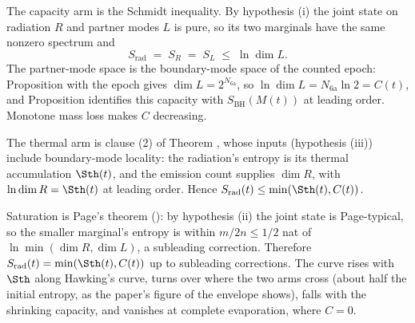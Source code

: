 The capacity arm is the Schmidt inequality. By hypothesis (i) the joint state on radiation $R$ and partner modes $L$ is pure, so its two marginals have the same nonzero spectrum and
\[
S_{\mathrm{rad}} \;=\; S_R \;=\; S_L \;\leq\; \ln\dim L .
\]
The partner-mode space is the boundary-mode space of the counted epoch: Proposition  with the epoch gives $\dim L = 2^{N_{\mathrm{6a}}}$, so $\ln\dim L = N_{\mathrm{6a}}\ln 2 = C(t)$, and Proposition  identifies this capacity with $S_{\mathrm{BH}}(M(t))$ at leading order. Monotone mass loss makes $C$ decreasing.

The thermal arm is clause (2) of Theorem , whose inputs (hypothesis (iii)) include boundary-mode locality: the radiation's entropy is its thermal accumulation $\Sth(t)$, and the emission count supplies $\dim R$, with $\ln\dim R = \Sth(t)$ at leading order. Hence $S_{\mathrm{rad}}(t) \leq \min(\Sth(t), C(t))$.

Saturation is Page's theorem (): by hypothesis (ii) the joint state is Page-typical, so the smaller marginal's entropy is within $m/2n \leq 1/2$ nat of $\ln\min(\dim R, \dim L)$, a subleading correction. Therefore $S_{\mathrm{rad}}(t) = \min(\Sth(t), C(t))$ up to subleading corrections. The curve rises with $\Sth$ along Hawking's curve, turns over where the two arms cross (about half the initial entropy, as the paper's figure of the envelope shows), falls with the shrinking capacity, and vanishes at complete evaporation, where $C = 0$.
